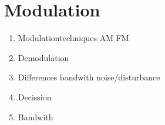 \section{Modulation}\label{sec:theory:mod}

\begin{enumerate}
  \item Modulationtechniques
  \subitem AM
  \subitem FM
  \item Demodulation
  \item Differences
  \subitem bandwith
  \subitem noise/disturbance
  \item Decission
  \item Bandwith
\end{enumerate}